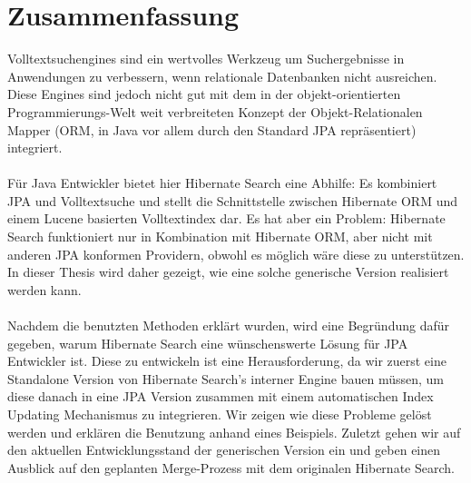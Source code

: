 \section*{Zusammenfassung}
Volltextsuchengines sind ein wertvolles Werkzeug um Suchergebnisse in Anwendungen zu verbessern, wenn relationale Datenbanken nicht ausreichen. Diese Engines sind jedoch nicht gut mit dem in der objekt-orientierten Programmierungs-Welt weit verbreiteten Konzept der Objekt-Relationalen Mapper (ORM, in Java vor allem durch den Standard JPA repräsentiert) integriert. 
\\\\
Für Java Entwickler bietet hier Hibernate Search eine Abhilfe: Es kombiniert JPA und Volltextsuche und stellt die Schnittstelle zwischen Hibernate ORM und einem Lucene basierten Volltextindex dar. Es hat aber ein Problem: Hibernate Search funktioniert nur in Kombination mit Hibernate ORM, aber nicht mit anderen JPA konformen Providern, obwohl es möglich wäre diese zu unterstützen. In dieser Thesis wird daher gezeigt, wie eine solche generische Version realisiert werden kann.
\\\\
Nachdem die benutzten Methoden erklärt wurden, wird eine Begründung dafür gegeben, warum Hibernate Search eine wünschenswerte Lösung für JPA Entwickler ist. Diese zu entwickeln ist eine Herausforderung, da wir zuerst eine Standalone Version von Hibernate Search's interner Engine bauen müssen, um diese danach in eine JPA Version zusammen mit einem automatischen Index Updating Mechanismus zu integrieren. Wir zeigen wie diese Probleme gelöst werden und erklären die Benutzung anhand eines Beispiels. Zuletzt gehen wir auf den aktuellen Entwicklungsstand der generischen Version ein und geben einen Ausblick auf den geplanten Merge-Prozess mit dem originalen Hibernate Search.

